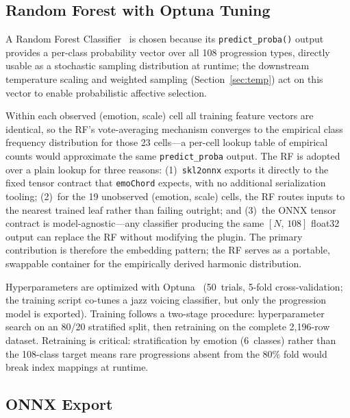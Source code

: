 \documentclass[runningheads,a4paper]{llncs}
\begin{document}
\subsection{Random Forest with Optuna Tuning}

A Random Forest Classifier~\cite{sklearn2011} is chosen because its
\texttt{predict\_proba()} output provides a per-class probability vector over
all 108 progression types, directly usable as a stochastic sampling distribution
at runtime; the downstream temperature scaling and weighted sampling
(Section~\ref{sec:temp}) act on this vector to enable probabilistic affective
selection.

Within each observed (emotion, scale) cell all training feature vectors are
identical, so the RF's vote-averaging mechanism converges to the empirical class
frequency distribution for those 23 cells---a per-cell lookup table of empirical
counts would approximate the same \texttt{predict\_proba} output. The RF is
adopted over a plain lookup for three reasons: (1)~\texttt{skl2onnx} exports it
directly to the fixed tensor contract that \texttt{emoChord} expects, with no
additional serialization tooling; (2)~for the 19 unobserved (emotion, scale)
cells, the RF routes inputs to the nearest trained leaf rather than failing
outright; and (3)~the ONNX tensor contract is model-agnostic---any classifier
producing the same $[N,\,108]$ float32 output can replace the RF without
modifying the plugin. The primary contribution is therefore the embedding
pattern; the RF serves as a portable, swappable container for the empirically
derived harmonic distribution.

Hyperparameters are optimized with Optuna~\cite{optuna2019} (50~trials, 5-fold cross-validation;
the training script co-tunes a jazz voicing classifier, but only the progression
model is exported). Training follows a two-stage procedure:
hyperparameter search on an 80/20 stratified split, then retraining on the
complete 2{,}196-row dataset. Retraining is critical: stratification by emotion
(6~classes) rather than the 108-class target means rare progressions absent
from the 80\% fold would break index mappings at runtime.

\subsection{ONNX Export}
\end{document}
